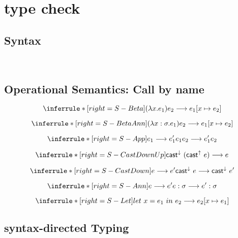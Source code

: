 \section{type check}

\subsection{Syntax}
\gram{
      \otte\ottinterrule
      \ottR\ottinterrule
      \ottt\ottinterrule
  }
\\[2.0mm]

\subsection{Operational Semantics: Call by name}

\newcommand{\castupe}{\ensuremath{\mathsf{cast}^{\uparrow}\ }}
\newcommand{\castdowne}{\ensuremath{\mathsf{cast}^{\downarrow}\ }}

\[
\inferrule*[right=S-Beta]
{  }
{ (\lambda x. e_1) e_2 \longrightarrow e_1 [x\mapsto e_2] }
\]

\[
\inferrule*[right=S-BetaAnn]
{  }
{ (\lambda x:\sigma. e_1) e_2 \longrightarrow e_1 [x\mapsto e_2] }
\]

\[
\inferrule*[right=S-App]
{ e_1 \longrightarrow e_1'  }
{ e_1 e_2 \longrightarrow e_1' e_2}
\]

\[
\inferrule*[right=S-CastDownUp]
{  }
{ \castdowne (\castupe e)  \longrightarrow e }
\]

\[
\inferrule*[right=S-CastDown]
{ e \longrightarrow e' }
{ \castdowne  e  \longrightarrow  \castdowne  e' }
\]

\[
\inferrule*[right=S-Ann]
{ e \longrightarrow e'  }
{ e:\sigma \longrightarrow e':\sigma}
\]

\[
\inferrule*[right=S-Let]
{  }
{ let\ x = e_1\ in\ e_2 \longrightarrow e_2[x\mapsto e_1] }
\]

\subsection{syntax-directed Typing}

\newcommand{\checktype}{\Gamma\vdash_\Downarrow}
\newcommand{\infertype}{\Gamma\vdash_\Uparrow}
\newcommand{\infercheck}{\Gamma\vdash_\delta}

\newcommand{\checktypeno}{\vdash_\Downarrow}
\newcommand{\infertypeno}{\vdash_\Uparrow}
\newcommand{\infercheckno}{\vdash_\delta}

\newcommand{\instinfer}{\vdash^{inst}_\Uparrow}
\newcommand{\instcheck}{\vdash^{inst}_\Downarrow}
\newcommand{\instinfercheck}{\vdash^{inst}_\delta}

